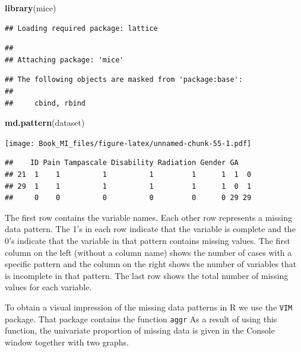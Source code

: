 \documentclass[]{book}
\newenvironment{Shaded}{\begin{snugshade}}{\end{snugshade}}
\newcommand{\KeywordTok}[1]{\textcolor[rgb]{0.13,0.29,0.53}{\textbf{#1}}}
\newcommand{\NormalTok}[1]{#1}
\theoremstyle{definition}
\theoremstyle{definition}
\theoremstyle{definition}
\theoremstyle{remark}
\begin{document}
\begin{Shaded}
\begin{Highlighting}[]
\KeywordTok{library}\NormalTok{(mice)}
\end{Highlighting}
\end{Shaded}

\begin{verbatim}
## Loading required package: lattice
\end{verbatim}

\begin{verbatim}
## 
## Attaching package: 'mice'
\end{verbatim}

\begin{verbatim}
## The following objects are masked from 'package:base':
## 
##     cbind, rbind
\end{verbatim}

\begin{Shaded}
\begin{Highlighting}[]
\KeywordTok{md.pattern}\NormalTok{(dataset)}
\end{Highlighting}
\end{Shaded}

\texttt{[image: Book\_MI\_files/figure-latex/unnamed-chunk-55-1.pdf]}

\begin{verbatim}
##    ID Pain Tampascale Disability Radiation Gender GA   
## 21  1    1          1          1         1      1  1  0
## 29  1    1          1          1         1      1  0  1
##     0    0          0          0         0      0 29 29
\end{verbatim}

The first row contains the variable names. Each other row represents a
missing data pattern. The 1's in each row indicate that the variable is
complete and the 0's indicate that the variable in that pattern contains
missing values. The first column on the left (without a column name)
shows the number of cases with a specific pattern and the column on the
right shows the number of variables that is incomplete in that pattern.
The last row shows the total number of missing values for each variable.

To obtain a visual impression of the missing data patterns in R we use
the \texttt{VIM} package. That package contains the function
\texttt{aggr} As a result of using this function, the univariate
proportion of missing data is given in the Console window together with
two graphs.
\end{document}
